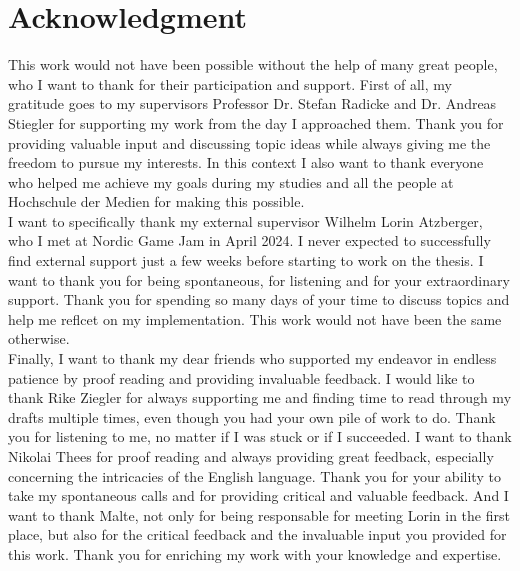 \chapter{Acknowledgment}

This work would not have been possible without the help of many great people, who I want to thank for their 
participation and support. First of all, my gratitude goes to my supervisors Professor Dr. Stefan Radicke 
and Dr. Andreas Stiegler for supporting my work from the day I approached them. Thank you for providing 
valuable input and discussing topic ideas while always giving me the freedom to pursue my interests. In 
this context I also want to thank everyone who helped me achieve my goals during my studies and all the 
people at Hochschule der Medien for making this possible. \\

\noindent
I want to specifically thank my external supervisor Wilhelm Lorin Atzberger, who I met at Nordic Game Jam 
in April 2024. I never expected to successfully find external support just a few weeks before starting to 
work on the thesis. I want to thank you for being spontaneous, for listening and for your extraordinary 
support. Thank you for spending so many days of your time to discuss topics and help me reflcet on my 
implementation. This work would not have been the same otherwise. \\

\noindent
Finally, I want to thank my dear friends who supported my endeavor in endless patience by proof reading and 
providing invaluable feedback. I would like to thank Rike Ziegler for always supporting me and finding time 
to read through my drafts multiple times, even though you had your own pile of work to do. Thank you for 
listening to me, no matter if I was stuck or if I succeeded. I want to thank Nikolai Thees for proof reading 
and always providing great feedback, especially concerning the intricacies of the English language. Thank you 
for your ability to take my spontaneous calls and for providing critical and valuable feedback. And I want to 
thank Malte, not only for being responsable for meeting Lorin in the first place, but also for the critical 
feedback and the invaluable input you provided for this work. Thank you for enriching my work with your 
knowledge and expertise. \\
